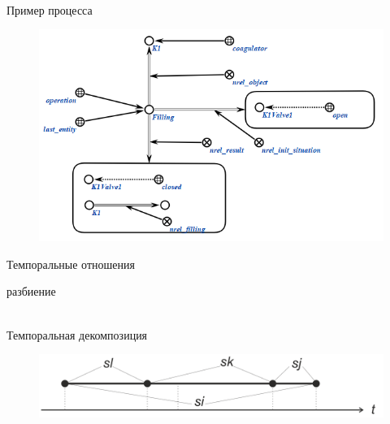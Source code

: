 \begin{frame}{\\Пример процесса}
\topline
\justifying
\vspace{10mm}
\begin{SCn}
	\begin{figure}[H]
		\includegraphics[scale=0.7]{./figures/sd_temp_entities/process_description.png}
	\end{figure}
\end{SCn}
\end{frame}

\begin{frame}{Темпоральные отношения}
	\topline
	\justifying
	\begin{scnindent}
		\begin{scnrelfromset}{разбиение}
		\end{scnrelfromset}
	\end{scnindent}
\end{frame}

\begin{frame}{\\Темпоральная декомпозиция}
	\topline
	\justifying
	\vspace{10mm}
	\begin{SCn}
		\begin{figure}[H]
			\includegraphics[scale=0.6]{./figures/sd_temp_entities/img_temporal_decomposition.png}
		\end{figure}
	\end{SCn}
\end{frame}

